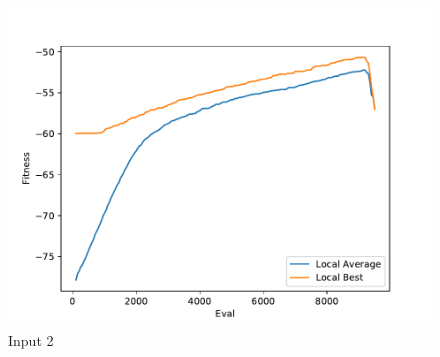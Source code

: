 \documentclass{standalone}
\begin{document}
\begin{figure}[!htb]
	\caption{Input 2}
	\label{fig:graph_2016}
	\includegraphics[width=\textwidth]{../graphs/graphs/2016.pdf}
\end{figure}
\end{document}
